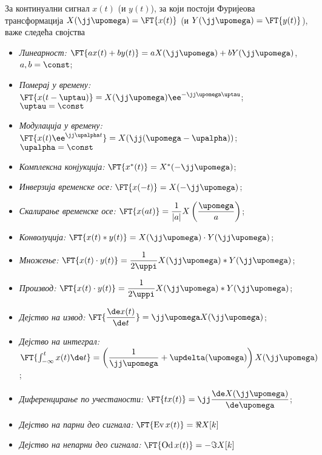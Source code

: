 
За континуални сигнал $x(t)$ (и $y(t)$), за који постоји Фуријеова трансформација
$X(\jj\upomega) = \FT{x(t)}$ (и $Y(\jj\upomega) = \FT{y(t)}$), важе следећа својства
\begin{itemize}
    \item \emph{Линеарност:} $\FT{ax(t) + by(t)} = a X(\jj\upomega) + b Y(\jj\upomega)$, \qquad $a,b = \const$;
    \item \emph{Померај у времену:} $\FT{x(t-\uptau)} = X(\jj\upomega) \ee^{-\jj\upomega \uptau}$; \qquad $\uptau = \const$
    \item \emph{Модулација у времену:} $\FT{x(t) \ee^{\jj\upalpha t}} = X(\jj(\upomega - \upalpha))$; \qquad $\upalpha = \const$
    \item \emph{Комплексна конјукција:} $\FT{x^{\ast}(t) } = X^{\ast}(-\jj\upomega)$; 
    \item \emph{Инверзија временске осе:} $\FT{x(-t) } = X(-\jj\upomega)$; 
    \item \emph{Скалирање временске осе:} $\FT{x(at)} = \dfrac{1}{|a|} X\left( \dfrac{\upomega}{a} \right)$;
    \item \emph{Конволуција:} $\FT{x(t) \ast y(t)} = X(\jj\upomega) \cdot Y(\jj\upomega)$; 
    \item \emph{Множење:} $\FT{x(t) \cdot y(t)} = \dfrac{1}{2\uppi} X(\jj\upomega) \ast Y(\jj\upomega)$; 
    \item \emph{Производ:} $\FT{x(t) \cdot y(t)} = \dfrac{1}{2\uppi} X(\jj\upomega) \ast Y(\jj\upomega)$;
    \item \emph{Дејство на извод:} $ \FT{ \dfrac{ \de x(t)}{\de t}} = \jj\upomega X(\jj\upomega)$;
    \item \emph{Дејство на интеграл:} $ \FT{ \int_{-\infty}^{t} x(t) \de t} =  
    \left( 
        \dfrac{1}{\jj\upomega} + \updelta(\upomega)
    \right) X(\jj\upomega)$;
    \item \emph{Диференцирање по учестаности:} 
    $
    \FT{ t x(t) } = \jj \dfrac{\de X(\jj\upomega)}{\de \upomega}
    $;
    \item \emph{Дејство на парни део сигнала:}
    $
    \FT{ \operatorname{Ev}x(t)} = \Re{X[k]}
    $
    \item \emph{Дејство на непарни део сигнала:}
    $
    \FT{ \operatorname{Od}x(t)} = -\Im{X[k]}
    $
    
\end{itemize} 


